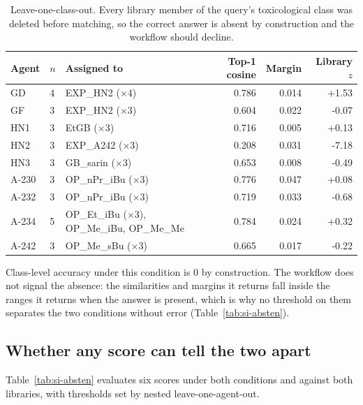 \documentclass[11pt]{article}
\begin{document}
\begin{table}[htbp]
\centering
\caption{Leave-one-class-out. Every library member of the query's toxicological class was deleted before matching, so the correct answer is absent by construction and the workflow should decline.}
\label{tab:si-loco}
\small
\begin{tabular}{llp{4.4cm}rrr}
\toprule
Agent & $n$ & Assigned to & Top-1 cosine & Margin & Library $z$ \\
\midrule
GD & 4 & EXP\_HN2 ($\times$4) & 0.786 & 0.014 & +1.53 \\
GF & 3 & EXP\_HN2 ($\times$3) & 0.604 & 0.022 & -0.07 \\
HN1 & 3 & EtGB ($\times$3) & 0.716 & 0.005 & +0.13 \\
HN2 & 3 & EXP\_A242 ($\times$3) & 0.208 & 0.031 & -7.18 \\
HN3 & 3 & GB\_sarin ($\times$3) & 0.653 & 0.008 & -0.49 \\
A-230 & 3 & OP\_nPr\_iBu ($\times$3) & 0.776 & 0.047 & +0.08 \\
A-232 & 3 & OP\_nPr\_iBu ($\times$3) & 0.719 & 0.033 & -0.68 \\
A-234 & 5 & OP\_Et\_iBu ($\times$3), OP\_Me\_iBu, OP\_Me\_Me & 0.784 & 0.024 & +0.32 \\
A-242 & 3 & OP\_Me\_sBu ($\times$3) & 0.665 & 0.017 & -0.22 \\
\bottomrule
\end{tabular}

\begin{flushleft}\footnotesize Class-level accuracy under this condition is 0 by construction. The workflow does not signal the absence: the similarities and margins it returns fall inside the ranges it returns when the answer is present, which is why no threshold on them separates the two conditions without error (Table~\ref{tab:si-absten}).\end{flushleft}
\end{table}
\clearpage

\subsection{Whether any score can tell the two apart}

Table~\ref{tab:si-absten} evaluates six scores under both conditions and against both
libraries, with thresholds set by nested leave-one-agent-out.
\end{document}
